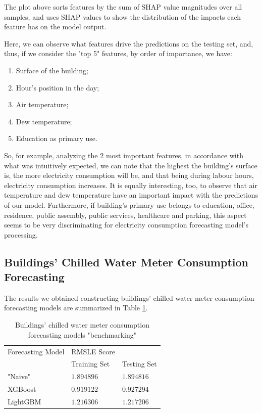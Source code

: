 \documentclass[twocolumn, switch]{article}
\begin{document}
The plot above sorts features by the sum of SHAP value magnitudes over all samples, and uses SHAP values to show the distribution of the impacts each feature has on the model output.

Here, we can observe what features drive the predictions on the testing set, and, thus, if we consider the "top 5" features, by order of importance, we have:

\begin{enumerate}
\item Surface of the building;
\item Hour's position in the day;
\item Air temperature;
\item Dew temperature;
\item Education as primary use.
\end{enumerate}

So, for example, analyzing the $2$ most important features, in accordance with what was intuitively expected, we can note that the highest the building's surface is, the more electricity consumption will be, and that being during labour hours, electricity consumption increases. It is equally interesting, too, to observe that air temperature and dew temperature have an important impact with the predictions of our model. Furthermore, if building's primary use belongs to education, office, residence, public assembly, public services, healthcare and parking, this aspect seems to be very discriminating for electricity consumption forecasting model's processing.

\subsection{Buildings' Chilled Water Meter Consumption Forecasting}

The results we obtained constructing buildings' chilled water meter consumption forecasting models are summarized in Table \ref{tab:chilled_water_benchmarking}.

\begin{table}[H]
\caption{Buildings' chilled water meter consumption forecasting models "benchmarking"}
\centering
\begin{tabular}{lll}
\toprule
Forecasting Model & RMSLE Score & \\
& Training Set & Testing Set \\
\midrule
"Naive" & $1.894896$ & $1.894816$ \\
XGBoost & $0.919122$ & $0.927294$ \\
LightGBM & $1.216306$ & $1.217206$ \\
\bottomrule
\end{tabular}
\label{tab:chilled_water_benchmarking}
\end{table}
\end{document}
